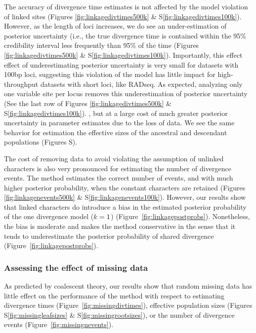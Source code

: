 The accuracy of divergence time estimates is not affected
by the model violation of linked sites
(Figures \ref{fig:linkagedivtimes500k}
\&
S\ref{fig:linkagedivtimes100k}).
However,
as the length of loci increases, we do see an under-estimation
of posterior uncertainty (i.e., the 
true divergence time is contained within the 95\% credibility interval 
less frequently than 95\% of the time
(Figures \ref{fig:linkagedivtimes500k}
\&
S\ref{fig:linkagedivtimes100k}).
Importantly, this effect effect of underestimating posterior uncertainty is
very small for datasets with 100bp loci, suggesting this violation of the model
has little impact for high-throughput datasets with short loci, like RADseq.
As expected, analyzing only one variable site per locus removes this underestimation
of posterior uncertainty
(See the last row of Figures \ref{fig:linkagedivtimes500k}
\&
S\ref{fig:linkagedivtimes100k}).
, but at a large cost of much greater posterior uncertainty
in parameter estimates due to the loss of data.
We see the same behavior for estimation the effective sizes of the ancestral
and descendant populations
(Figures S).

The cost of removing data to avoid violating the assumption of unlinked
characters is also very pronounced for estimating the number of divergence
events.
The method estimates the correct number of events, and with much higher
posterior probability, when the constant characters are retained 
(Figures
\ref{fig:linkagenevents500k}
\&
S\ref{fig:linkagenevents100k}).
However, our results show that linked characters do introduce a bias in the
estimated posterior probability of the one divergence model ($k_{} = 1$)
(Figure~\ref{fig:linkagepostprobs}).
Nonetheless, the bias is moderate and makes the method conservative in the
sense that it tends to underestimate the posterior probability of shared
divergence (Figure~\ref{fig:linkagepostprobs}).


\subsubsection{Assessing the effect of missing data}

As predicted by coalescent theory, our results show that random missing data
has little effect on the performance of the method with respect to estimating
divergence times
(Figure~\ref{fig:missingdivtimes}),
effective population sizes
(Figures
S\ref{fig:missingleafsizes}
\&
S\ref{fig:missingrootsizes}), or the number of divergence events
(Figure~\ref{fig:missingnevents}).



